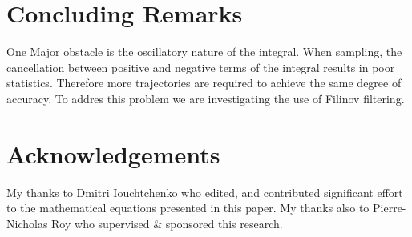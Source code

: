 \documentclass[12pt,letterpaper,oneside,final,titlepage]{article}               %
\numberwithin{equation}{section} %
\begin{document}
\section{Concluding Remarks}
One Major obstacle is the oscillatory nature of the integral. When sampling, the cancellation between positive and negative terms of the integral results in poor statistics. Therefore more trajectories are required to achieve the same degree of accuracy. To addres this problem we are investigating the use of Filinov filtering.

\newpage

\section{Acknowledgements}
My thanks to Dmitri Iouchtchenko who edited, and contributed significant effort to the mathematical equations presented in this paper. 
My thanks also to Pierre-Nicholas Roy who supervised \& sponsored this research.

\renewcommand*{\bibfont}{\scriptsize}
\printbibliography
\end{document}

